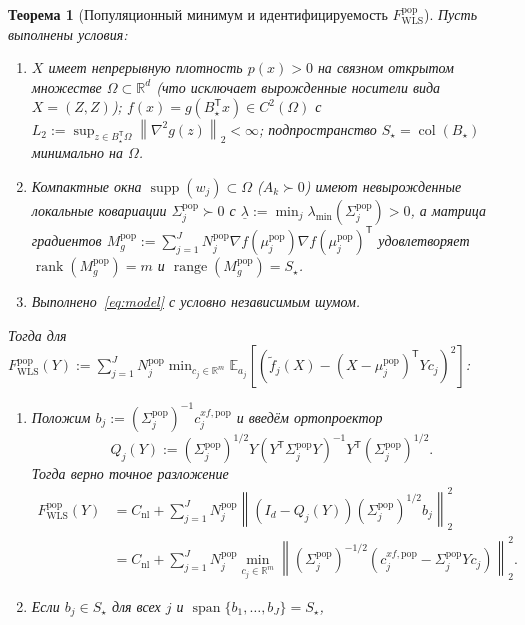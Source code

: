 \documentclass[11pt,a4paper]{article}
\numberwithin{equation}{section}
\newtheorem{theorem}{Теорема}[section]
\theoremstyle{definition}
\theoremstyle{remark}
\newcommand{\R}{\mathbb{R}}
\newcommand{\E}{\mathbb{E}}
\newcommand{\rank}{\operatorname{rank}}
\newcommand{\col}{\operatorname{col}}
\newcommand{\supp}{\operatorname{supp}}
\newcommand{\T}{^{\mathsf T}}
\newcommand{\norm}[1]{\left\lVert #1 \right\rVert}
\begin{document}
\begin{theorem}[Популяционный минимум и идентифицируемость $F_{\mathrm{WLS}}^{\mathrm{pop}}$]
\label{thm:wls-pop}
Пусть выполнены условия:
\begin{enumerate}[label=(A\arabic*)]
  \item $X$ имеет непрерывную плотность $p(x) > 0$ на связном открытом множестве $\Omega \subset \R^d$
  (что исключает вырожденные носители вида $X = (Z, Z)$); $f(x) = g(B_\star\T x) \in C^2(\Omega)$ с
  $L_2 := \sup_{z \in B_\star\T \Omega} \norm{\nabla^2 g(z)}_2 < \infty$; подпространство $S_\star = \col(B_\star)$ минимально на $\Omega$.
  \item Компактные окна $\supp(w_j) \subset \Omega$ ($A_k \succ 0$) имеют невырожденные локальные ковариации
  $\Sigma_j^{\mathrm{pop}} \succ 0$ с $\underline{\lambda} := \min_j \lambda_{\min}(\Sigma_j^{\mathrm{pop}}) > 0$,
  а матрица градиентов $M_g^{\mathrm{pop}} := \sum_{j=1}^J N_j^{\mathrm{pop}} \nabla f(\mu_j^{\mathrm{pop}}) \nabla f(\mu_j^{\mathrm{pop}})\T$
  удовлетворяет $\rank(M_g^{\mathrm{pop}}) = m$ и $\operatorname{range}(M_g^{\mathrm{pop}}) = S_\star$.
  \item Выполнено~\eqref{eq:model} с условно независимым шумом.
\end{enumerate}
Тогда для $F_{\mathrm{WLS}}^{\mathrm{pop}}(Y) := \sum_{j=1}^J N_j^{\mathrm{pop}} \min_{c_j \in \R^m} \E_{a_j}[(\tilde{f}_j(X) - (X - \mu_j^{\mathrm{pop}})\T Y c_j)^2]$:
\begin{enumerate}[label=(\alph*)]
  \item Положим $b_j := (\Sigma_j^{\mathrm{pop}})^{-1} c_j^{xf,\mathrm{pop}}$ и введём ортопроектор
  \[
    Q_j(Y) := (\Sigma_j^{\mathrm{pop}})^{1/2} Y (Y\T \Sigma_j^{\mathrm{pop}} Y)^{-1} Y\T (\Sigma_j^{\mathrm{pop}})^{1/2}.
  \]
  Тогда верно точное разложение
  \begin{equation}\label{eq:wls-pyth}
  \begin{aligned}
    F_{\mathrm{WLS}}^{\mathrm{pop}}(Y)
    &= C_{\mathrm{nl}} + \sum_{j=1}^J N_j^{\mathrm{pop}} \norm{(I_d - Q_j(Y))(\Sigma_j^{\mathrm{pop}})^{1/2} b_j}_2^2 \\
    &= C_{\mathrm{nl}} + \sum_{j=1}^J N_j^{\mathrm{pop}} \min_{c_j \in \R^m} \norm{(\Sigma_j^{\mathrm{pop}})^{-1/2}(c_j^{xf,\mathrm{pop}} - \Sigma_j^{\mathrm{pop}} Y c_j)}_2^2.
  \end{aligned}
  \end{equation}
  \item Если $b_j \in S_\star$ для всех $j$ и $\operatorname{span}\{b_1,\dots,b_J\} = S_\star$,

\end{enumerate}
\end{theorem}
\end{document}

